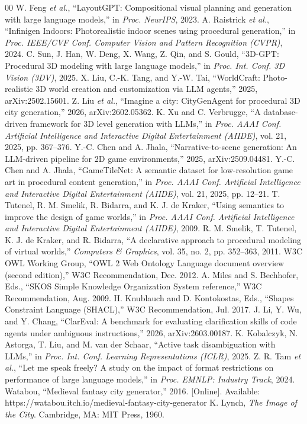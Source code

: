 \documentclass[conference]{IEEEtran}
\begin{document}
\begin{thebibliography}{00}
 W. Feng \textit{et al.}, ``LayoutGPT: Compositional visual planning and generation with large language models,'' in \textit{Proc. NeurIPS}, 2023.
 A. Raistrick \textit{et al.}, ``Infinigen Indoors: Photorealistic indoor scenes using procedural generation,'' in \textit{Proc. IEEE/CVF Conf. Computer Vision and Pattern Recognition (CVPR)}, 2024.
 C. Sun, J. Han, W. Deng, X. Wang, Z. Qin, and S. Gould, ``3D-GPT: Procedural 3D modeling with large language models,'' in \textit{Proc. Int. Conf. 3D Vision (3DV)}, 2025.
 X. Liu, C.-K. Tang, and Y.-W. Tai, ``WorldCraft: Photo-realistic 3D world creation and customization via LLM agents,'' 2025, arXiv:2502.15601.
 Z. Liu \textit{et al.}, ``Imagine a city: CityGenAgent for procedural 3D city generation,'' 2026, arXiv:2602.05362.
 K. Xu and C. Verbrugge, ``A database-driven framework for 3D level generation with LLMs,'' in \textit{Proc. AAAI Conf. Artificial Intelligence and Interactive Digital Entertainment (AIIDE)}, vol. 21, 2025, pp. 367--376.
 Y.-C. Chen and A. Jhala, ``Narrative-to-scene generation: An LLM-driven pipeline for 2D game environments,'' 2025, arXiv:2509.04481.
 Y.-C. Chen and A. Jhala, ``GameTileNet: A semantic dataset for low-resolution game art in procedural content generation,'' in \textit{Proc. AAAI Conf. Artificial Intelligence and Interactive Digital Entertainment (AIIDE)}, vol. 21, 2025, pp. 12--21.
 T. Tutenel, R. M. Smelik, R. Bidarra, and K. J. de Kraker, ``Using semantics to improve the design of game worlds,'' in \textit{Proc. AAAI Conf. Artificial Intelligence and Interactive Digital Entertainment (AIIDE)}, 2009.
 R. M. Smelik, T. Tutenel, K. J. de Kraker, and R. Bidarra, ``A declarative approach to procedural modeling of virtual worlds,'' \textit{Computers \& Graphics}, vol. 35, no. 2, pp. 352--363, 2011.
 W3C OWL Working Group, ``OWL 2 Web Ontology Language document overview (second edition),'' W3C Recommendation, Dec. 2012.
 A. Miles and S. Bechhofer, Eds., ``SKOS Simple Knowledge Organization System reference,'' W3C Recommendation, Aug. 2009.
 H. Knublauch and D. Kontokostas, Eds., ``Shapes Constraint Language (SHACL),'' W3C Recommendation, Jul. 2017.
 J. Li, Y. Wu, and Y. Chang, ``ClarEval: A benchmark for evaluating clarification skills of code agents under ambiguous instructions,'' 2026, arXiv:2603.00187.
 K. Kobalczyk, N. Astorga, T. Liu, and M. van der Schaar, ``Active task disambiguation with LLMs,'' in \textit{Proc. Int. Conf. Learning Representations (ICLR)}, 2025.
 Z. R. Tam \textit{et al.}, ``Let me speak freely? A study on the impact of format restrictions on performance of large language models,'' in \textit{Proc. EMNLP: Industry Track}, 2024.
 Watabou, ``Medieval fantasy city generator,'' 2016. [Online]. Available: https://watabou.itch.io/medieval-fantasy-city-generator
 K. Lynch, \textit{The Image of the City}. Cambridge, MA: MIT Press, 1960.
\end{thebibliography}
\end{document}
